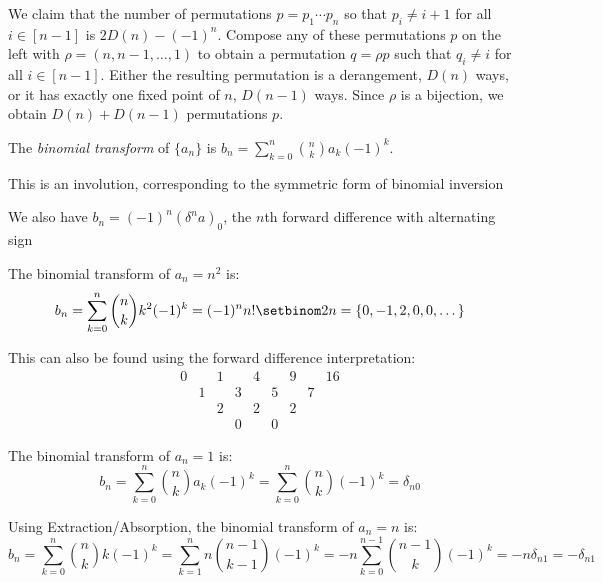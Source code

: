 \documentclass[a4paper]{article}
\begin{document}
\begin{example}
We claim that the number of permutations $p=p_1\cdots p_n$ so that $p_i\neq i+1$ for all $i\in[n-1]$ is $2D(n)-(-1)^n$. Compose any of these permutations $p$ on the left with $\rho=(n,n-1,\dots,1)$ to obtain a permutation $q=\rho p$ such that $q_i\neq i$ for all $i\in[n-1]$. Either the resulting permutation is a derangement, $D(n)$ ways, or it has exactly one fixed point of $n$, $D(n-1)$ ways. Since $\rho$ is a bijection, we obtain $D(n)+D(n-1)$ permutations $p$.
\end{example}

\begin{definition}
The \emph{binomial transform} of $\{a_n\}$ is $b_n=\sum_{k=0}^n\binom nka_k(-1)^k$.
\begin{arrows}
\item This is an involution, corresponding to the symmetric form of binomial inversion
\item We also have $b_n=(-1)^n(\delta^na)_0$, the $n$th forward difference with alternating sign
\end{arrows}
\end{definition}

\begin{example}
The binomial transform of $a_n=n^2$ is:
\begin{equation*}
b_n=\sum_{k=0}^n\binom nkk^2(-1)^k=(-1)^nn!\setbinom 2n=\{0,-1,2,0,0,\dots\}
\end{equation*}

This can also be found using the forward difference interpretation:
\begin{equation*}
\begin{array}{ccccccccc}
\boxed{0}&&1&&4&&9&&16\\
&\boxed{1}&&3&&5&&7\\
&&\boxed{2}&&2&&2\\
&&&\boxed{0}&&0
\end{array}
\end{equation*}
\end{example}

\begin{example}
The binomial transform of $a_n=1$ is:
\begin{equation*}
b_n=\sum_{k=0}^n\binom nka_k(-1)^k=\sum_{k=0}^n\binom nk(-1)^k=\delta_{n0}
\end{equation*}
\end{example}

\begin{example}
Using Extraction/Absorption, the binomial transform of $a_n=n$ is:
\begin{equation*}
b_n=\sum_{k=0}^n\binom nkk(-1)^k
=\sum_{k=1}^nn\binom{n-1}{k-1}(-1)^k
=-n\sum_{k=0}^{n-1}\binom{n-1}{k}(-1)^k
=-n\delta_{n1}
=-\delta_{n1}
\end{equation*}
\end{example}
\end{document}
